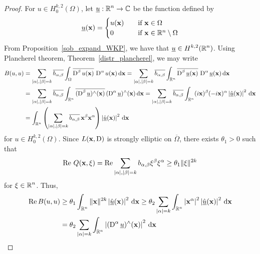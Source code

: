 \begin{proof}
For $\displaystyle u \in H^{k,2}_0(\Omega)$, let
$\displaystyle \underline{u}: \mathbb{R}^n \rightarrow \mathbb{C}$ be the function defined by
\[
\underline{u}(\mathbf{x}) =
\begin{cases}
u(\mathbf{x}) & \quad \text{if} \ \mathbf{x} \in \Omega \\
0 & \quad \text{if} \ \mathbf{x} \in \mathbb{R}^n \setminus \Omega
\end{cases}
\]
From Proposition~\ref{sob_expand_WKP}, we have that
$\displaystyle \underline{u}\in H^{k,2}(\mathbb{R}^n)$.
Using Plancherel theorem, Theorem~\ref{distr_plancherel}, we may write
\begin{align*}
B(u,u) &= \sum_{|\alpha|,|\beta|= k} \overline{b_{\alpha,\beta}}
\int_{\Omega} \overline{\operatorname{D}^\beta u(\mathbf{x})}\, \operatorname{D}^\alpha u(\mathbf{x})
\,\mathrm{d}{\mathbf{x}}
= \sum_{|\alpha|,|\beta|= k} \overline{b_{\alpha,\beta}}
\int_{\mathbb{R}^n} \overline{\operatorname{D}^\beta \underline{u}(\mathbf{x})}\,
\operatorname{D}^\alpha \underline{u}(\mathbf{x}) \,\mathrm{d}{\mathbf{x}} \\
&= \sum_{|\alpha|,|\beta|= k} \overline{b_{\alpha,\beta}}
\int_{\mathbb{R}^n} \overline{(\operatorname{D}^\beta \underline{u})^\wedge(\mathbf{x})}\,
(\operatorname{D}^\alpha \underline{u})^\wedge(\mathbf{x}) \,\mathrm{d}{\mathbf{x}}
= \sum_{|\alpha|,|\beta|= k} \overline{b_{\alpha,\beta}}
\int_{\mathbb{R}^n} (i\mathbf{x})^\beta (-i\mathbf{x})^\alpha
\left| \hat{\underline{u}}(\mathbf{x}) \right|^2 \,\mathrm{d}{\mathbf{x}} \\
&= \int_{\mathbb{R}^n} \left( \sum_{|\alpha|,|\beta|= k} \overline{b_{\alpha,\beta}}
\,\mathbf{x}^\beta \mathbf{x}^\alpha \right)
\left| \hat{\underline{u}}(\mathbf{x}) \right|^2 \,\mathrm{d}{\mathbf{x}}
\end{align*}
for $\displaystyle u \in H^{k,2}_0(\Omega)$.
Since $L(\mathbf{x},\operatorname{D})$ is strongly elliptic on $\overline{\Omega}$,
there exists $\theta_1 >0$ such that
\begin{equation} \label{ell_garding2_theta}
\operatorname{Re}\, Q(\mathbf{x}, \mathbf{\xi}) = \operatorname{Re}
\sum_{|\alpha|,|\beta|=k} b_{\alpha,\beta} \mathbf{\xi}^\beta
\mathbf{\xi}^\alpha \geq \theta_1 \|\mathbf{\xi}\|^{2k}
\end{equation}
for $\displaystyle \xi \in \mathbb{R}^n$.  Thus,
\begin{align*}
\RE B(u,u) &\geq \theta_1 \int_{\RR^n} \| \VEC{x} \|^{2k}
\left| \hat{\underline{u}}(\VEC{x}) \right|^2 \dx{\VEC{x}}
\geq \theta_2 \sum_{|\alpha|=k} \int_{\RR^n}
\left| \VEC{x}^\alpha \right|^2 
\left| \hat{\underline{u}}(\VEC{x}) \right|^2 \dx{\VEC{x}} \\
&= \theta_2 \sum_{|\alpha|=k} \int_{\RR^n} \left|
(\diff^\alpha \underline{u})^\wedge (\VEC{x}) \right|^2 \dx{\VEC{x}} 

\end{align*}
\end{proof}
